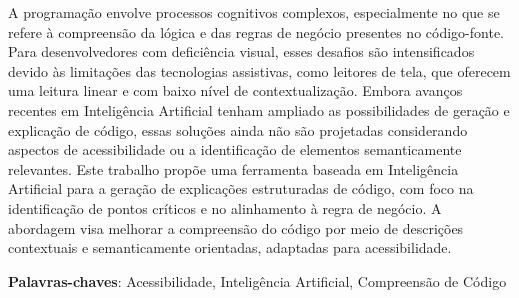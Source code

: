 \documentclass[
    12pt,                   %
    openright,              %
    oneside,                %
    a4paper,                %
    sumario=tradicional,    %
    english,                %
    brazil,                 %
    ]{abntex2}
\begin{document}
\frenchspacing

\pretextual

\imprimircapa

\imprimirfolhaderosto






\begin{resumo}
 \noindent
 A programação envolve processos cognitivos complexos, especialmente no que se refere à compreensão da lógica e das regras de negócio presentes no código-fonte. Para desenvolvedores com deficiência visual, esses desafios são intensificados devido às limitações das tecnologias assistivas, como leitores de tela, que oferecem uma leitura linear e com baixo nível de contextualização. Embora avanços recentes em Inteligência Artificial tenham ampliado as possibilidades de geração e explicação de código, essas soluções ainda não são projetadas considerando aspectos de acessibilidade ou a identificação de elementos semanticamente relevantes. Este trabalho propõe uma ferramenta baseada em Inteligência Artificial para a geração de explicações estruturadas de código, com foco na identificação de pontos críticos e no alinhamento à regra de negócio. A abordagem visa melhorar a compreensão do código por meio de descrições contextuais e semanticamente orientadas, adaptadas para acessibilidade.
 \vspace{\onelineskip}

 \noindent
 \textbf{Palavras-chaves}: Acessibilidade, Inteligência Artificial, Compreensão de Código
\end{resumo}
\end{document}
